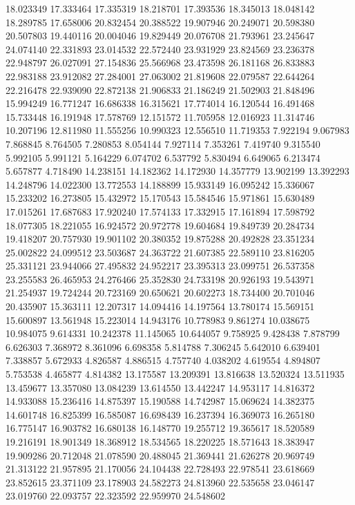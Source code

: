 18.023349
17.333464
17.335319
18.218701
17.393536
18.345013
18.048142
18.289785
17.658006
20.832454
20.388522
19.907946
20.249071
20.598380
20.507803
19.440116
20.004046
19.829449
20.076708
21.793961
23.245647
24.074140
22.331893
23.014532
22.572440
23.931929
23.824569
23.236378
22.948797
26.027091
27.154836
25.566968
23.473598
26.181168
26.833883
22.983188
23.912082
27.284001
27.063002
21.819608
22.079587
22.644264
22.216478
22.939090
22.872138
21.906833
21.186249
21.502903
21.848496
15.994249
16.771247
16.686338
16.315621
17.774014
16.120544
16.491468
15.733448
16.191948
17.578769
12.151572
11.705958
12.016923
11.314746
10.207196
12.811980
11.555256
10.990323
12.556510
11.719353
7.922194
9.067983
7.868845
8.764505
7.280853
8.054144
7.927114
7.353261
7.419740
9.315540
5.992105
5.991121
5.164229
6.074702
6.537792
5.830494
6.649065
6.213474
5.657877
4.718490
14.238151
14.182362
14.172930
14.357779
13.902199
13.392293
14.248796
14.022300
13.772553
14.188899
15.933149
16.095242
15.336067
15.233202
16.273805
15.432972
15.170543
15.584546
15.971861
15.630489
17.015261
17.687683
17.920240
17.574133
17.332915
17.161894
17.598792
18.077305
18.221055
16.924572
20.972778
19.604684
19.849739
20.284734
19.418207
20.757930
19.901102
20.380352
19.875288
20.492828
23.351234
25.002822
24.099512
23.503687
24.363722
21.607385
22.589110
23.816205
25.331121
23.944066
27.495832
24.952217
23.395313
23.099751
26.537358
23.255583
26.465953
24.276466
25.352830
24.733198
20.926193
19.543971
21.254937
19.724244
20.723169
20.650621
20.602273
18.734400
20.701046
20.435907
15.363111
12.207317
14.094416
14.197564
13.780174
15.569151
15.600897
13.561948
15.223014
14.943176
10.778983
9.861274
10.038675
10.984075
9.614331
10.242378
11.145065
10.644057
9.758925
9.428438
7.878799
6.626303
7.368972
8.361096
6.698358
5.814788
7.306245
5.642010
6.639401
7.338857
5.672933
4.826587
4.886515
4.757740
4.038202
4.619554
4.894807
5.753538
4.465877
4.814382
13.175587
13.209391
13.816638
13.520324
13.511935
13.459677
13.357080
13.084239
13.614550
13.442247
14.953117
14.816372
14.933088
15.236416
14.875397
15.190588
14.742987
15.069624
14.382375
14.601748
16.825399
16.585087
16.698439
16.237394
16.369073
16.265180
16.775147
16.903782
16.680138
16.148770
19.255712
19.365617
18.520589
19.216191
18.901349
18.368912
18.534565
18.220225
18.571643
18.383947
19.909286
20.712048
21.078590
20.488045
21.369441
21.626278
20.969749
21.313122
21.957895
21.170056
24.104438
22.728493
22.978541
23.618669
23.852615
23.371109
23.178903
24.582273
24.813960
22.535658
23.046147
23.019760
22.093757
22.323592
22.959970
24.548602
